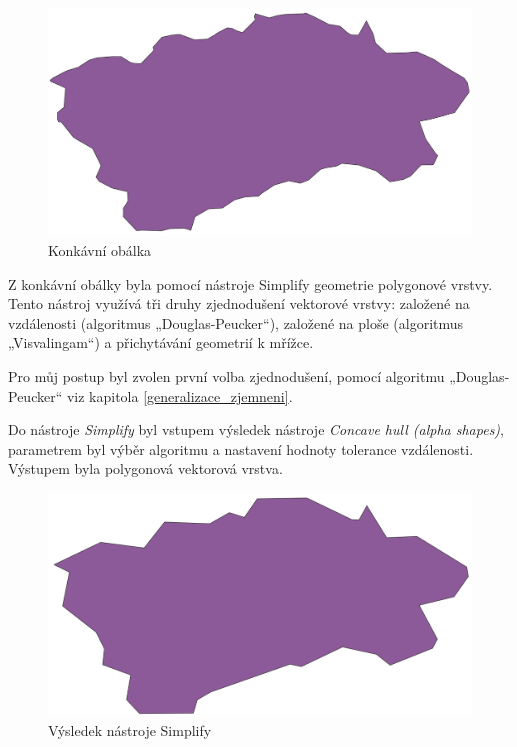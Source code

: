 \begin{figure}[H] \centering
    \includegraphics[width=400pt]{./pictures/concaveHull-P0B.png}
    \caption[Konkávní obálka]{Konkávní obálka}
	\label{fig:concaveHull-P0B}              
\end{figure} 

Z konkávní obálky byla pomocí nástroje Simplify  geometrie polygonové vrstvy. Tento nástroj
využívá tři druhy zjednodušení vektorové vrstvy: založené na vzdálenosti (algoritmus „Douglas-Peucker“),
založené na ploše (algoritmus „Visvalingam“) a přichytávání geometrií k mřížce.

Pro můj postup byl zvolen první volba zjednodušení, pomocí algoritmu „Douglas-Peucker“ viz kapitola \ref{generalizace_zjemneni}.


Do nástroje \textit{Simplify} byl vstupem výsledek nástroje \textit{Concave hull (alpha shapes)}, parametrem byl výběr algoritmu 
a nastavení hodnoty tolerance vzdálenosti. Výstupem byla polygonová vektorová vrstva.

\begin{figure}[H] \centering
    \includegraphics[width=400pt]{./pictures/simplify-P0B.png}
    \caption[Výsledek nástroje Simplify]{Výsledek nástroje Simplify}
	\label{fig:simplify-P0B}                                
\end{figure}

